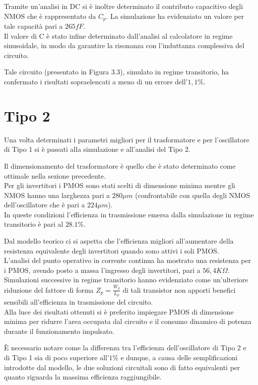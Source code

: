 \documentclass[a4paper, 12pt]{memoir}
\begin{document}
Tramite un'analisi in DC si è inoltre determinato il contributo capacitivo
degli NMOS che è rappresentato da $C_p$. La simulazione ha evidenziato un
valore per tale capacità pari a $265fF$.\\
Il valore di C è stato infine determinato dall'analisi al calcolatore in regime
sinusoidale, in modo da garantire la risonanza con l'induttanza complessiva del
circuito.

Tale circuito (presentato in Figura 3.3), simulato in regime transitorio, ha
confermato i risultati sopraelencati a meno di un errore dell'$1,1\%$.

\section{Tipo 2}
Una volta determinati i parametri migliori per il trasformatore e per 
l'oscillatore di Tipo 1 si è passati alla simulazione e all'analisi del Tipo 2.

Il dimensionamento del trasformatore è quello che è stato determinato come
ottimale nella sezione precedente.\\
Per gli invertitori i PMOS sono stati scelti di dimensione minima mentre gli
NMOS hanno una larghezza pari a $280 \mu m$ (confrontabile con quella degli
NMOS dell'oscillatore che è pari a $224 \mu m$).\\
In queste condizioni l'efficienza in trasmissione emersa dalla simulazione in
regime transitorio è pari al $28.1\%$.

Dal modello teorico ci si aspetta che l'efficienza migliori all'aumentare della
resistenza equivalente degli invertitori quando sono attivi i soli PMOS.\\
L'analisi del punto operativo in corrente continua ha mostrato una resistenza 
per i PMOS, avendo posto a massa l'ingresso degli invertitori, pari a
$56,4 K\Omega$.\\
Simulazioni successive in regime transitorio hanno evidenziato come 
un'ulteriore riduzione del fattore di forma $Z_p=\frac{W_p}{L_p}$ di tali
transistor non apporti benefici sensibili all'efficienza in trasmissione del
circuito.\\
Alla luce dei risultati ottenuti si è preferito impiegare PMOS di dimensione
minima per ridurre l'area occupata dal circuito e il consumo dinamico di 
potenza durante il funzionamento impulsato.

\`E necessario notare come la differenza tra l'efficienza dell'oscillatore di
Tipo 2 e di Tipo 1 sia di poco superiore all'$1\%$ e dunque, a causa delle
semplificazioni introdotte dal modello, le due soluzioni circuitali sono di
fatto equivalenti per quanto riguarda la massima efficienza raggiungibile.
\end{document}
